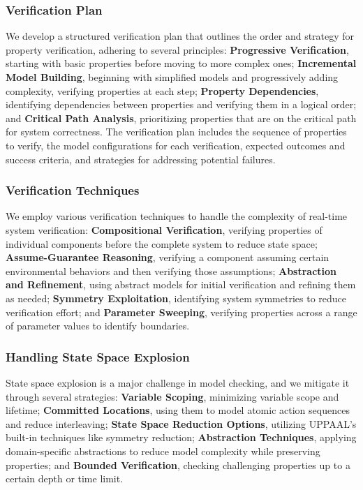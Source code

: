 \subsubsection{Verification Plan}
We develop a structured verification plan that outlines the order and strategy for property verification, adhering to several principles: \textbf{Progressive Verification}, starting with basic properties before moving to more complex ones; \textbf{Incremental Model Building}, beginning with simplified models and progressively adding complexity, verifying properties at each step; \textbf{Property Dependencies}, identifying dependencies between properties and verifying them in a logical order; and \textbf{Critical Path Analysis}, prioritizing properties that are on the critical path for system correctness. The verification plan includes the sequence of properties to verify, the model configurations for each verification, expected outcomes and success criteria, and strategies for addressing potential failures.

\subsubsection{Verification Techniques}
We employ various verification techniques to handle the complexity of real-time system verification: \textbf{Compositional Verification}, verifying properties of individual components before the complete system to reduce state space; \textbf{Assume-Guarantee Reasoning}, verifying a component assuming certain environmental behaviors and then verifying those assumptions; \textbf{Abstraction and Refinement}, using abstract models for initial verification and refining them as needed; \textbf{Symmetry Exploitation}, identifying system symmetries to reduce verification effort; and \textbf{Parameter Sweeping}, verifying properties across a range of parameter values to identify boundaries.

\subsubsection{Handling State Space Explosion}
State space explosion is a major challenge in model checking, and we mitigate it through several strategies: \textbf{Variable Scoping}, minimizing variable scope and lifetime; \textbf{Committed Locations}, using them to model atomic action sequences and reduce interleaving; \textbf{State Space Reduction Options}, utilizing UPPAAL's built-in techniques like symmetry reduction; \textbf{Abstraction Techniques}, applying domain-specific abstractions to reduce model complexity while preserving properties; and \textbf{Bounded Verification}, checking challenging properties up to a certain depth or time limit.


